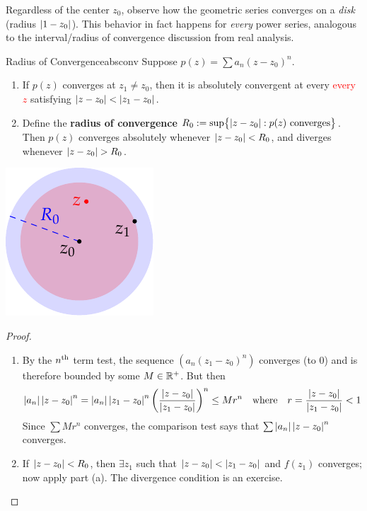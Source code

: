 Regardless of the center $z_0$, observe how the geometric series converges on a \emph{disk} (radius $\left| 1-z_0\right|$). This behavior in fact happens for \emph{every} power series, analogous to the interval/radius of convergence discussion from real analysis.


\begin{thm}[lower separated=false, sidebyside, sidebyside align=top seam, sidebyside gap=0pt, righthand width=0.23\linewidth]{Radius of Convergence}{absconv}
	Suppose $p(z)=\sum a_n(z-z_0)^n$.
	\begin{enumerate}
	  \item If $p(z)$ converges at $z_1\neq z_0$, then it is absolutely convergent at every \textcolor{red}{every $z$} satisfying $\left| z-z_0\right|<\left| z_1-z_0\right|$.
		\item Define the \textbf{radius of convergence} $R_0:=\sup\bigl\{\left| z-z_0\right|: p(z) \text{ converges}\bigr\}$. Then $p(z)$ converges absolutely whenever $\left| z-z_0\right|<R_0$, and diverges whenever $\nm{z-z_0}>R_0$.
	\end{enumerate}
	\tcblower
	\flushright\includegraphics[scale=0.95]{conv}
\end{thm}



\begin{proof}
	\begin{enumerate}
	  \item By the $n\textsuperscript{th}$ term test, the sequence $(a_n(z_1-z_0)^n)$ converges (to 0) and is therefore bounded by some $M\in\mathbb{R}^+$. But then
		\[
			\left| a_n\right|\left| z-z_0\right|^n
			=\left| a_n\right|\left| z_1-z_0\right|^n\left(\frac{\left| z-z_0\right|}{\left| z_1-z_0\right|}\right)^n
			\le Mr^n
			\quad\text{where}\quad 
			r=\frac{\left| z-z_0\right|}{\left| z_1-z_0\right|}<1
		\]
		Since $\sum Mr^n$ converges, the comparison test says that $\sum\left| a_n\right|\left| z-z_0\right|^n$ converges.
		\item If $\left| z-z_0\right|<R_0$, then $\exists z_1$ such that $\left| z-z_0\right|<\left| z_1-z_0\right|$ and $f(z_1)$ converges; now apply part (a). The divergence condition is an exercise.\qedhere
	\end{enumerate}
\end{proof}

